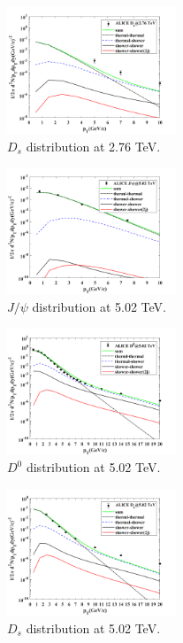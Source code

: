\documentclass[twocolumn,aps,superscriptaddress,nofootinbib,floatfix]{revtex4}
\begin{document}
\begin{figure}[H]
	\includegraphics[width=0.45\textwidth]{v16_Ds_276_0612.png}
	\caption{$D_s$ distribution at 2.76 TeV. }
	\label{fig92}
\end{figure}
\begin{figure}[H]
	\includegraphics[width=0.45\textwidth]{v16_Jpsi_502_0612.png}
	\caption{$J/\psi$ distribution at 5.02 TeV. }
	\label{fig93}
\end{figure}
\begin{figure}[H]
	\includegraphics[width=0.45\textwidth]{v16_D0_502_0612.png}
	\caption{$D^0$ distribution at 5.02 TeV. }
	\label{fig94}
\end{figure}

\begin{figure}[H]
	\includegraphics[width=0.45\textwidth]{v16_Ds_502_0612.png}
	\caption{$D_s$ distribution at 5.02 TeV. }
	\label{fig95}
\end{figure}
\end{document}
